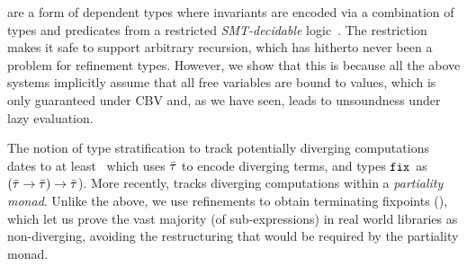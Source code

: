
 are a form of dependent types where 
invariants are encoded via a combination of types and predicates
from a restricted \emph{SMT-decidable} 
logic~\cite{Rushby98,pfenningxi98,Dunfield07,GordonTOPLAS2011}. 
%
The restriction makes it safe to support arbitrary recursion, 
which has hitherto never been a problem for refinement types.
%
However, we show that this is because all the above systems 
implicitly assume that all free variables are bound to values, 
which is only guaranteed under CBV and, as we have seen, leads 
to unsoundness under lazy evaluation.

%
%


The notion of type stratification to track potentially 
diverging computations dates to at least~\citep{ConstableS87} 
which uses $\bar{\mathit{\tau}}$ to encode diverging terms, and types 
$\mathtt{fix}_{}$ as $(\bar{\mathit{\tau}}\rightarrow\bar{\mathit{\tau}}) \rightarrow \bar{\mathit{\tau}}$).
%
More recently, \cite{Capretta05} tracks diverging 
computations within a \emph{partiality monad}.
%
Unlike the above, we use refinements to 
obtain terminating fixpoints (\etfix{}), which let us prove 
the vast majority (of sub-expressions) in real world libraries 
as non-diverging, avoiding the restructuring that would
be required by the partiality monad.

